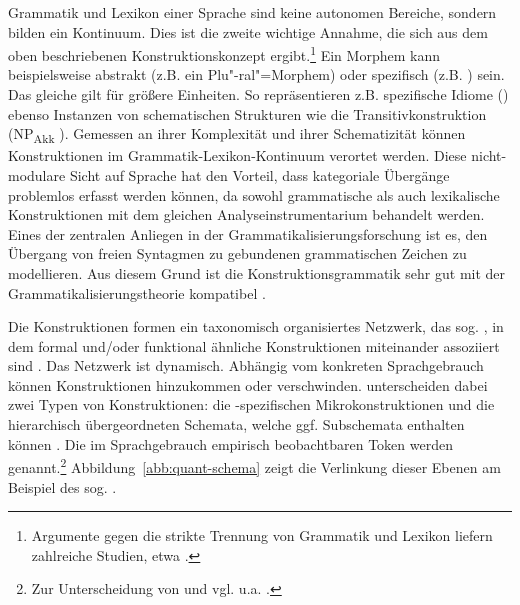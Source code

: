 
Grammatik und Lexikon einer Sprache sind keine autonomen Bereiche, sondern bilden ein Kontinuum. Dies ist die zweite wichtige Annahme, die sich aus dem oben beschriebenen  Konstruktionskonzept ergibt.\footnote{Argumente gegen die strikte Trennung von Grammatik und Lexikon liefern zahlreiche Studien, etwa \textcite{Goldberg2006}.} Ein Morphem kann beispielsweise abstrakt (z.B. ein Plu"-ral"=Morphem) oder spezifisch (z.B. ) sein. Das gleiche gilt für größere Einheiten. So repräsentieren z.B. spezifische Idiome () ebenso Instanzen von schematischen Strukturen wie die Transitivkonstruktion  (NP\textsubscript{Akk} ). Gemessen an ihrer Komplexität und ihrer Schematizität können Konstruktionen im Grammatik-Lexikon-Kontinuum verortet werden. Diese nicht-modulare Sicht auf Sprache hat den Vorteil, dass kategoriale Übergänge problemlos erfasst werden können, da sowohl grammatische als auch lexikalische Konstruktionen mit dem gleichen Analyseinstrumentarium behandelt werden. Eines der zentralen Anliegen in der Grammatikalisierungsforschung ist es, den Übergang von freien Syntagmen zu gebundenen grammatischen Zeichen zu modellieren. Aus diesem Grund ist die Konstruktionsgrammatik sehr gut mit der Grammatikalisierungstheorie kompatibel \parencite[zur weiterführenden Diskussion s. ][85]{Diewald2008}. 


Die Konstruktionen formen ein taxonomisch organisiertes Netzwerk, das sog.  \parencite[95]{Ziem2013}, in dem formal und/oder funktional ähnliche Konstruktionen miteinander assoziiert sind \parencites()()[]{Langacker1987}[262--265]{Croft2004}[]{Bybee2010}. Das Netzwerk ist dynamisch. Abhängig vom konkreten Sprachgebrauch können  Konstruktionen hinzukommen oder verschwinden. \textcite[17]{Traugott2013} unterscheiden dabei zwei Typen von Konstruktionen: die -spezifischen Mikrokonstruktionen und die hierarchisch übergeordneten Schemata, welche ggf. Subschemata enthalten können \parencite[s. auch][]{Traugott2015}. Die im Sprachgebrauch empirisch beobachtbaren Token werden  genannt.\footnote{Zur Unterscheidung von  und  vgl. u.a. \textcite[][423]{Fried2013}.} Abbildung~\ref{abb:quant-schema} zeigt die Verlinkung dieser Ebenen am Beispiel des sog.  \parencite[aus][17]{Traugott2013}. 

